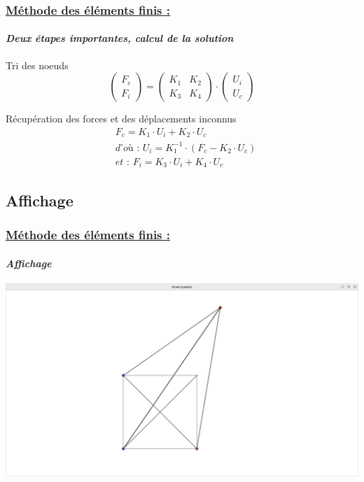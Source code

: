 \documentclass[10pt]{beamer}
\begin{document}
	\begin{frame}
		\frametitle{\uline{M\'ethode des \'el\'ements finis :}}
		\framesubtitle{\textit{Deux \'etapes importantes, calcul de la solution}}
		\begin{block}{Tri des noeuds}
			\begin{equation}
				\begin{pmatrix}
				F_c \\
				F_i
				\end{pmatrix}
				=
				\begin{pmatrix}
				K_1 & K_2 \\
				K_3 & K_4
				\end{pmatrix}
				\cdot
				\begin{pmatrix}
				U_i \\
				U_c
				\end{pmatrix}
			\end{equation}
		\end{block}
		\begin{block}{R\'ecup\'eration des forces et des d\'eplacements inconnus}
			\begin{align}
				&F_c = K_1 \cdot U_i + K_2 \cdot U_c\\
				&\textit{d'o\`u : } U_i = K_1^{-1} \cdot (F_c - K_2 \cdot U_c)\\
				&\textit{et : } F_i = K_3 \cdot U_i + K_4 \cdot U_c
			\end{align}
		\end{block}
	\end{frame}
	\subsection{Affichage}
	\begin{frame}
		\frametitle{\uline{M\'ethode des \'el\'ements finis :}}
		\framesubtitle{\textit{Affichage}}
		\includegraphics[scale = 0.17]{Images/Copium.png}
	\end{frame} 
\end{document}
